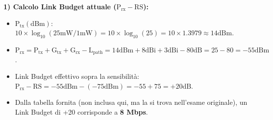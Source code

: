 \textbf{1) Calcolo Link Budget attuale ($\text{P}_{\text{rx}} - \text{RS}$):}
\begin{itemize}
    \item $\text{P}_{\text{tx}} (\text{dBm})$: $10 \times \log_{10}(25\text{mW} / 1\text{mW}) = 10 \times \log_{10}(25) = 10 \times 1.3979 \approx 14\text{dBm}$.
    \item $\text{P}_{\text{rx}} = \text{P}_{\text{tx}} + \text{G}_{\text{tx}} + \text{G}_{\text{rx}} - \text{L}_{\text{path}} = 14\text{dBm} + 8\text{dBi} + 3\text{dBi} - 80\text{dB} = 25 - 80 = -55\text{dBm}$.
    \item Link Budget effettivo sopra la sensibilità: $\text{P}_{\text{rx}} - \text{RS} = -55\text{dBm} - (-75\text{dBm}) = -55 + 75 = +20\text{dB}$.
    \item Dalla tabella fornita (non inclusa qui, ma la si trova nell'esame originale), un Link Budget di +20 corrisponde a \textbf{8 Mbps}.
\end{itemize}

